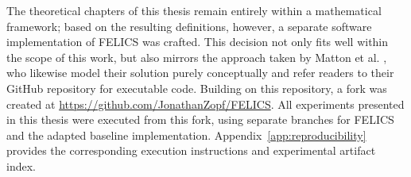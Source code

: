 The theoretical chapters of this thesis remain entirely within a mathematical framework; based on the resulting definitions, however, a separate software implementation of FELICS was crafted. This decision not only fits well within the scope of this work, but also mirrors the approach taken by Matton et al. \cite{mattonWalkTalkMeasuring2024}, who likewise model their solution purely conceptually and refer readers to their GitHub repository for executable code. Building on this repository, a fork was created at \url{https://github.com/JonathanZopf/FELICS}. All experiments presented in this thesis were executed from this fork, using separate branches for FELICS and the adapted baseline implementation. Appendix~\ref{app:reproducibility} provides the corresponding execution instructions and experimental artifact index.
